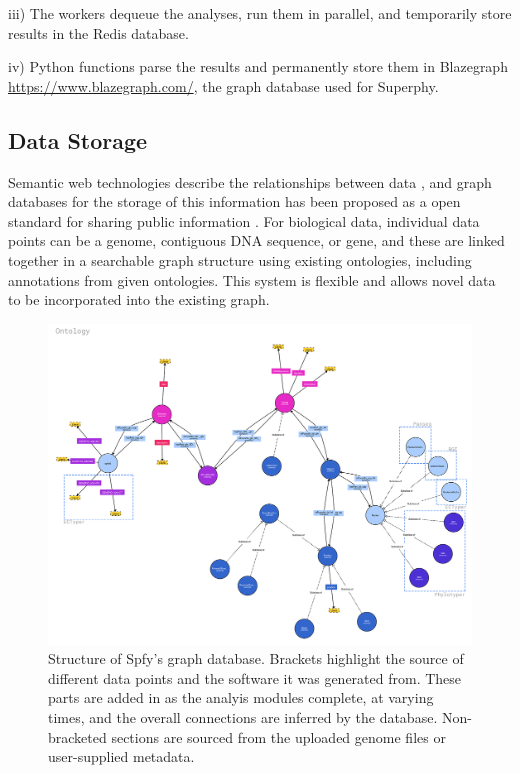 \documentclass{article}
\begin{document}
iii) The workers dequeue the analyses, run them in parallel, and temporarily store results in the Redis database.

iv) Python functions parse the results and permanently store them in Blazegraph \url{https://www.blazegraph.com/}, the graph database used for Superphy.

\subsection{Data Storage}
Semantic web technologies describe the relationships between data \cite{berners2001semantic}, and graph databases for the storage of this information has been proposed as a open standard for sharing public information \cite{horrocks2005semantic}. For biological data, individual data points can be a genome, contiguous DNA sequence, or gene, and these are linked together in a searchable graph structure using existing ontologies, including annotations from given ontologies. This system is flexible and allows novel data to be incorporated into the existing graph.
\begin{figure}[!hb]
\begin{center}
\includegraphics[width=\textwidth]{images/ontology}
\end{center}
\caption{Structure of Spfy's graph database. Brackets highlight the source of different data points and the software it was generated from. These parts are added in as the analyis modules complete, at varying times, and the overall connections are inferred by the database. Non-bracketed sections are sourced from the uploaded genome files or user-supplied metadata.}
\label{fig-ontology}
\end{figure}
\end{document}
